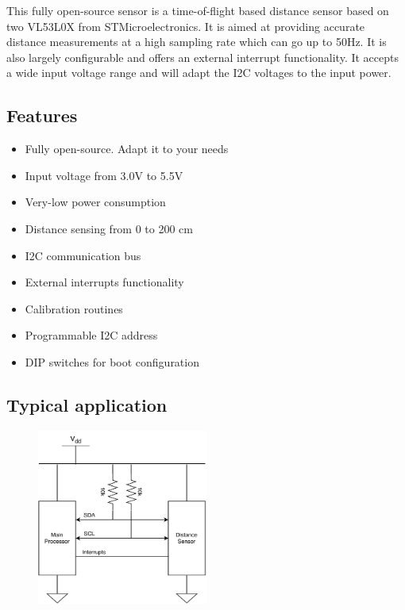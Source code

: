 
\begin{multicols}{2}
	This fully open-source sensor is a time-of-flight based distance sensor based on two VL53L0X from STMicroelectronics. It is aimed at providing accurate distance measurements at a high sampling rate which can go up to 50Hz. It is also largely configurable and offers an external interrupt functionality. It accepts a wide input voltage range and will adapt the I2C voltages to the input power. 
	\columnbreak
	\subsection{Features}
	\begin{itemize}
		\item Fully open-source. Adapt it to your needs
		\item Input voltage from 3.0V to 5.5V
		\item Very-low power consumption
		\item Distance sensing from 0 to 200 cm
		\item I2C communication bus
		\item External interrupts functionality
		\item Calibration routines
		\item Programmable I2C address
		\item DIP switches for boot configuration
	\end{itemize}
\end{multicols}

\subsection{Typical application}

\begin{figure}[h]
\centering
	\includegraphics[width=0.5\textwidth]{../pdf/dual-vl53l0x-sensor.pdf}
	
\end{figure}